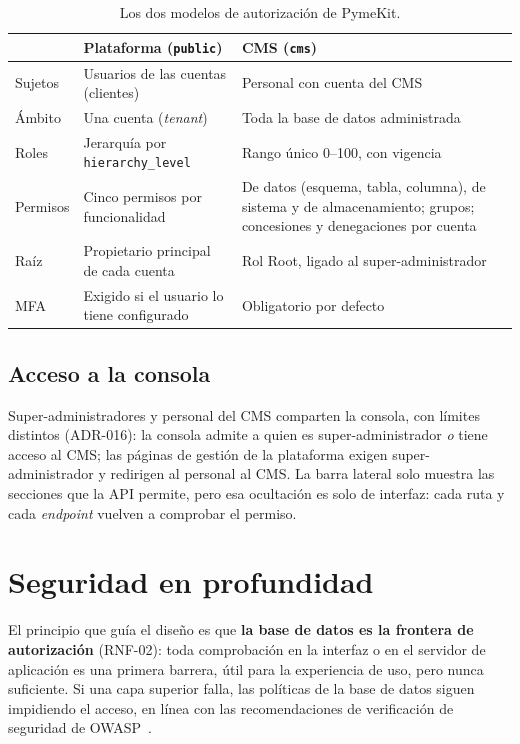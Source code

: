 \begin{table}[htbp]
  \centering
  \footnotesize
  \caption{Los dos modelos de autorización de PymeKit.}
  \label{tab:dis-dos-modelos}
  \begin{tabularx}{\textwidth}{@{}>{\raggedright\arraybackslash}p{2.6cm}XX@{}}
    \toprule
     & \textbf{Plataforma (\texttt{public})} & \textbf{CMS (\texttt{cms})} \\
    \midrule
    Sujetos & Usuarios de las cuentas (clientes) & Personal con cuenta del CMS \\
    Ámbito & Una cuenta (\textit{tenant}) & Toda la base de datos administrada \\
    Roles & Jerarquía por \texttt{hierarchy\_level} & Rango único 0--100, con vigencia \\
    Permisos & Cinco permisos por funcionalidad & De datos (esquema, tabla, columna), de sistema y de almacenamiento; grupos; concesiones y denegaciones por cuenta \\
    Raíz & Propietario principal de cada cuenta & Rol Root, ligado al super-administrador \\
    MFA & Exigido si el usuario lo tiene configurado & Obligatorio por defecto \\
    \bottomrule
  \end{tabularx}
\end{table}

\subsection{Acceso a la consola}
\label{sec:dis-acceso-consola}

Super-administradores y personal del CMS comparten la consola, con límites
distintos (ADR-016): la consola admite a quien es super-administrador
\emph{o} tiene acceso al CMS; las páginas de gestión de la plataforma exigen
super-administrador y redirigen al personal al CMS. La barra lateral solo
muestra las secciones que la API permite, pero esa ocultación es solo de
interfaz: cada ruta y cada \textit{endpoint} vuelven a comprobar el permiso.

\section{Seguridad en profundidad}
\label{sec:dis-seguridad}

El principio que guía el diseño es que \textbf{la base de datos es la
frontera de autorización} (RNF-02): toda comprobación en la interfaz o en el
servidor de aplicación es una primera barrera, útil para la experiencia de
uso, pero nunca suficiente. Si una capa superior falla, las políticas de la
base de datos siguen impidiendo el acceso, en línea con las recomendaciones
de verificación de seguridad de OWASP~\cite{owasp-asvs}.

